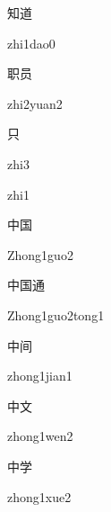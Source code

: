 \begin{verbete}{知道}
\begin{pronuncia}{zhi1dao0}
\end{pronuncia}
\end{verbete}

\begin{verbete}{职员}
\begin{pronuncia}{zhi2yuan2}
\end{pronuncia}
\end{verbete}

\begin{verbete}[zhi3]{只}
\begin{pronuncia}{zhi3}
\end{pronuncia}
\begin{pronuncia}{zhi1}
\end{pronuncia}
\end{verbete}

\begin{verbete}{中国}
\begin{pronuncia}{Zhong1guo2}
\end{pronuncia}
\end{verbete}

\begin{verbete}{中国通}
\begin{pronuncia}{Zhong1guo2tong1}
\end{pronuncia}
\end{verbete}

\begin{verbete}{中间}
\begin{pronuncia}{zhong1jian1}
\end{pronuncia}
\end{verbete}

\begin{verbete}{中文}
\begin{pronuncia}{zhong1wen2}
\end{pronuncia}
\end{verbete}

\begin{verbete}{中学}
\begin{pronuncia}{zhong1xue2}
\end{pronuncia}
\end{verbete}

